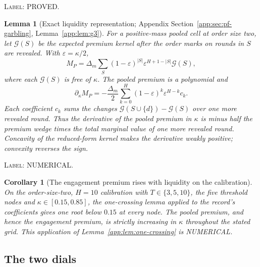 \documentclass[11pt]{article}
\newtheorem{lemma}{Lemma}
\newtheorem{corollary}{Corollary}
\newcommand{\Grev}{\mathcal{G}}
\begin{document}
\noindent\textsc{Label: PROVED.}\par
\begin{lemma}[Exact liquidity representation; Appendix Section~\ref{app:sec:pf-garbling}, Lemma~\ref{app:lem:g3}]
\label{lem:liquidity-representation}
For a positive-mass pooled cell at order size two, let $\Grev(S)$ be the expected premium kernel
after the order marks on rounds in $S$ are revealed. With $\varepsilon=\kappa/2$,
\begin{equation}
\label{eq:liquidity-representation-main}
M_P=\Delta_m\sum_S(1-\varepsilon)^{|S|}\varepsilon^{H+1-|S|}\Grev(S),
\end{equation}
where each $\Grev(S)$ is free of $\kappa$. The pooled premium is a polynomial and
\begin{equation}
\label{eq:liquidity-derivative-main}
\partial_\kappa M_P=-\frac{\Delta_m}{2}
\sum_{k=0}^{H}(1-\varepsilon)^k\varepsilon^{H-k}c_k.
\end{equation}
Each coefficient $c_k$ sums the changes $\Grev(S\cup\{d\})-\Grev(S)$ over one more revealed round.
Thus the derivative of the pooled premium in $\kappa$ is minus half the premium wedge times the
total marginal value of one more revealed round. Concavity of the reduced-form kernel makes the
derivative weakly positive; convexity reverses the sign.
\end{lemma}

\noindent\textsc{Label: NUMERICAL.}\par
\begin{corollary}[The engagement premium rises with liquidity on the calibration]
\label{cor:monotone-premium}
On the order-size-two, $H=10$ calibration with $T\in\{3,5,10\}$, the five threshold nodes and
$\kappa\in[0.15,0.85]$, the one-crossing lemma applied to the record's coefficients gives one root
below $0.15$ at every node. The pooled premium, and hence the engagement premium, is strictly
increasing in $\kappa$ throughout the stated grid. This application of
Lemma~\ref{app:lem:one-crossing} is NUMERICAL.
\end{corollary}

\subsection{The two dials}
\label{sec:dials}
\end{document}
